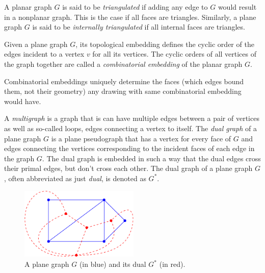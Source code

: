 \begin{definition}
	A planar graph $G$ is said to be \emph{triangulated} if adding any edge to $G$ would result in a nonplanar graph. This is the case if all faces are triangles.
	Similarly, a plane graph $G$ is said to be \emph{internally triangulated} if all internal faces are triangles.
\end{definition}

\begin{definition}
	Given a plane graph $G$, its topological embedding defines the cyclic order of the edges incident to a vertex $v$ for all its vertices. The cyclic orders of all vertices of the graph together are called a \emph{combinatorial embedding} of the planar graph $G$.
\end{definition}

Combinatorial embeddings uniquely determine the faces (which edges bound them, not their geometry) any drawing with same combinatorial embedding would have.

\begin{definition}
	A \emph{multigraph} is a graph that is can have multiple edges between a pair of vertices as well as so-called loops, \ie{} edges connecting a vertex to itself.
	The \emph{dual graph} of a plane graph $G$ is a plane pseudograph that has a vertex for every face of $G$ and edges connecting the vertices corresponding to the incident faces of each edge in the graph $G$. The dual graph is embedded in such a way that the dual edges cross their primal edges, but don't cross each other. The dual graph of a plane graph $G$, often abbreviated as just \emph{dual}, is denoted as $G^*$.
\end{definition}

\begin{figure}[H]
	\centering\includegraphics[height=130px]{Resources/Preliminaries-Dual.pdf}
	\caption{A plane graph $G$ (in blue) and its dual $G^*$ (in red).}
	\label{fig:preliminaries-dual}
\end{figure}


